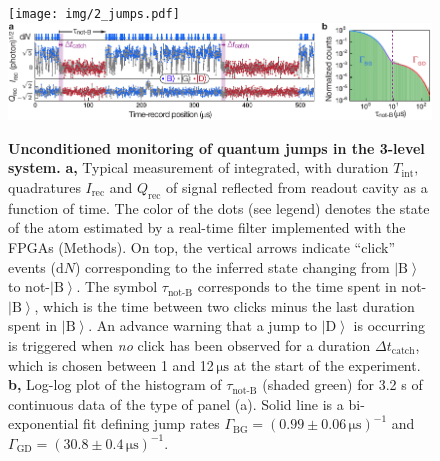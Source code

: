 \documentclass[
	 			preprint,     		superscriptaddress, 																longbibliography,
		amsmath, amssymb,
		aps,  prb,   		floatfix,
		linenumbers     
	]{revtex4-1}
\newcommand{\ket}[1]{\left|#1\right>}
\begin{document}
\begin{figure}
\label{fig:jumps}
\begin{centering}
\ifjournal
	\texttt{[image: img/2\_jumps.pdf]}
\else
	\includegraphics[width=147mm]{2_jumps.pdf}
\fi
\caption{
\textbf{Unconditioned monitoring of quantum jumps in the 3-level system.} 
\textbf{a,} 
Typical measurement of integrated, with duration $T_\mathrm{int},$ quadratures $I_\mathrm{rec}$ and $Q_\mathrm{rec}$ of signal reflected from readout cavity  as a function of time. 
The color of the dots (see legend) denotes the state of the atom estimated by a real-time filter implemented with the FPGAs (Methods). 
On top, the vertical arrows indicate ``click'' events ($\mathrm{d}N$) corresponding to the inferred state changing from $\ket{\mathrm{B}}$ to not-$\ket{\mathrm{B}}$.
The symbol $\tau_{\operatorname{not-B}}$ corresponds to the time spent in not-$\ket{\mathrm{B}}$, which is the time between two clicks minus the last duration spent in $\ket{\mathrm{B}}$.  
An advance warning that a jump to $\ket{\mathrm{D}}$ is occurring is triggered when \textit{no} click has been observed for a duration $\Delta t_\mathrm{catch}$, which is chosen between 1 and 12$\,\mathrm{\mu s}$ at the start of the experiment.
\textbf{b,}  Log-log plot of the histogram of $\tau_{\operatorname{not-B}}$ (shaded green) for 3.2 s of continuous data of the type of panel (a).
Solid line is a bi-exponential fit defining jump rates $\Gamma_{\mathrm {BG}}= \left( 0.99\pm0.06\,\mathrm{\mu s}\right)^{-1}$ and  $\Gamma_{\mathrm{GD}}= \left(30.8\pm0.4\,\mathrm{\mu s}\right)^{-1}$.  
}
\end{centering}
\end{figure}
\end{document}
